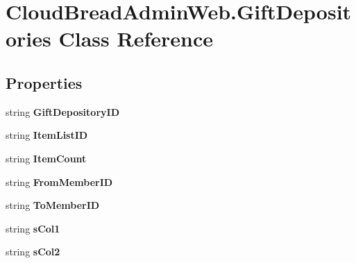 \hypertarget{a00086}{}\section{Cloud\+Bread\+Admin\+Web.\+Gift\+Depositories Class Reference}
\label{a00086}
\subsection*{Properties}
\begin{DoxyCompactItemize}
\item 
string {\bfseries Gift\+Depository\+ID}\hypertarget{a00086_a76c49c1714a8fa79c994317493ce4af4}{}\label{a00086_a76c49c1714a8fa79c994317493ce4af4}

\item 
string {\bfseries Item\+List\+ID}\hypertarget{a00086_ad177025b7cad26e9b84015cf6d018c2a}{}\label{a00086_ad177025b7cad26e9b84015cf6d018c2a}

\item 
string {\bfseries Item\+Count}\hypertarget{a00086_abcff89f2ed73f8c00524eb7552e44442}{}\label{a00086_abcff89f2ed73f8c00524eb7552e44442}

\item 
string {\bfseries From\+Member\+ID}\hypertarget{a00086_af174cb0460016548f85d09f8ec3fa405}{}\label{a00086_af174cb0460016548f85d09f8ec3fa405}

\item 
string {\bfseries To\+Member\+ID}\hypertarget{a00086_a40041d2de30d27046218b671de82defc}{}\label{a00086_a40041d2de30d27046218b671de82defc}

\item 
string {\bfseries s\+Col1}\hypertarget{a00086_a46cb18eeb4d284fa9cc838eec55416f1}{}\label{a00086_a46cb18eeb4d284fa9cc838eec55416f1}

\item 
string {\bfseries s\+Col2}\hypertarget{a00086_a90f76fb3ba5d90890eac7e48bcfae83f}{}\label{a00086_a90f76fb3ba5d90890eac7e48bcfae83f}


\end{DoxyCompactItemize}
